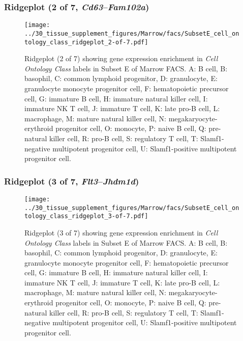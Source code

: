 \clearpage

\subsubsection{Ridgeplot (2 of 7, \emph{Cd63}--\emph{Fam102a})}
\begin{figure}[h]
\centering
\texttt{[image: ../30\_tissue\_supplement\_figures/Marrow/facs/SubsetE\_cell\_ontology\_class\_ridgeplot\_2-of-7.pdf]}

\caption{ Ridgeplot (2 of 7)  showing gene expression enrichment in \emph{Cell Ontology Class} labels in Subset E of Marrow FACS. A: B cell, B: basophil, C: common lymphoid progenitor, D: granulocyte, E: granulocyte monocyte progenitor cell, F: hematopoietic precursor cell, G: immature B cell, H: immature natural killer cell, I: immature NK T cell, J: immature T cell, K: late pro-B cell, L: macrophage, M: mature natural killer cell, N: megakaryocyte-erythroid progenitor cell, O: monocyte, P: naive B cell, Q: pre-natural killer cell, R: pro-B cell, S: regulatory T cell, T: Slamf1-negative multipotent progenitor cell, U: Slamf1-positive multipotent progenitor cell.}
\end{figure}


\clearpage

\subsubsection{Ridgeplot (3 of 7, \emph{Flt3}--\emph{Jhdm1d})}
\begin{figure}[h]
\centering
\texttt{[image: ../30\_tissue\_supplement\_figures/Marrow/facs/SubsetE\_cell\_ontology\_class\_ridgeplot\_3-of-7.pdf]}

\caption{ Ridgeplot (3 of 7)  showing gene expression enrichment in \emph{Cell Ontology Class} labels in Subset E of Marrow FACS. A: B cell, B: basophil, C: common lymphoid progenitor, D: granulocyte, E: granulocyte monocyte progenitor cell, F: hematopoietic precursor cell, G: immature B cell, H: immature natural killer cell, I: immature NK T cell, J: immature T cell, K: late pro-B cell, L: macrophage, M: mature natural killer cell, N: megakaryocyte-erythroid progenitor cell, O: monocyte, P: naive B cell, Q: pre-natural killer cell, R: pro-B cell, S: regulatory T cell, T: Slamf1-negative multipotent progenitor cell, U: Slamf1-positive multipotent progenitor cell.}
\end{figure}


\clearpage

